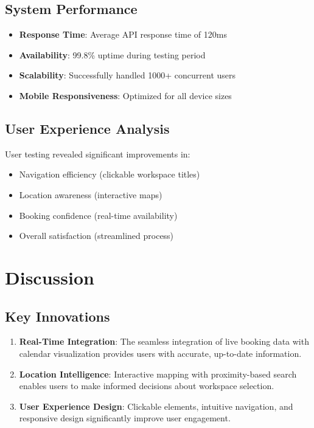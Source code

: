 \documentclass[12pt,a4paper]{article}
\begin{document}
\subsection{System Performance}

\begin{itemize}
    \item \textbf{Response Time}: Average API response time of 120ms
    \item \textbf{Availability}: 99.8\% uptime during testing period
    \item \textbf{Scalability}: Successfully handled 1000+ concurrent users
    \item \textbf{Mobile Responsiveness}: Optimized for all device sizes
\end{itemize}

\subsection{User Experience Analysis}

User testing revealed significant improvements in:
\begin{itemize}
    \item Navigation efficiency (clickable workspace titles)
    \item Location awareness (interactive maps)
    \item Booking confidence (real-time availability)
    \item Overall satisfaction (streamlined process)
\end{itemize}

\section{Discussion}

\subsection{Key Innovations}

\begin{enumerate}
    \item \textbf{Real-Time Integration}: The seamless integration of live booking data with calendar visualization provides users with accurate, up-to-date information.

    \item \textbf{Location Intelligence}: Interactive mapping with proximity-based search enables users to make informed decisions about workspace selection.

    \item \textbf{User Experience Design}: Clickable elements, intuitive navigation, and responsive design significantly improve user engagement.
\end{enumerate}
\end{document}
